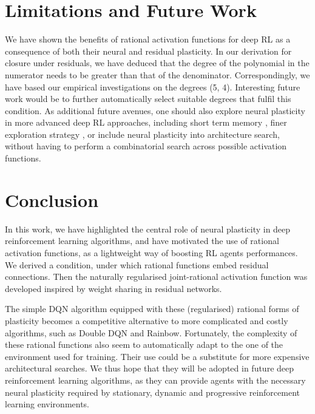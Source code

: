 \documentclass[accepted]{article}
\theoremstyle{plain}
\theoremstyle{definition}
\theoremstyle{remark}
\begin{document}
\section{Limitations and Future Work}
We have shown the benefits of rational activation functions for deep RL as a consequence of both their neural and residual plasticity. In our derivation for closure under residuals, we have deduced that the degree of the polynomial in the numerator needs to be greater than that of the denominator. Correspondingly, we have based our empirical investigations on the degrees (5, 4). Interesting future work would be to further automatically select suitable degrees that fulfil this condition. 
As additional future avenues, one should also explore neural plasticity in more advanced deep RL approaches, including short term memory \citep{Kapturowski19r2d2}, finer exploration strategy \citep{BadiaSVGPKTAPBB20NGU}, or include neural plasticity into architecture search, without having to perform a combinatorial search across possible activation functions.



\section{Conclusion}
In this work, we have highlighted the central role of neural plasticity in deep reinforcement learning algorithms, and have motivated the use of rational activation functions, as a lightweight way of boosting RL agents performances. We derived a condition, under which rational functions embed residual connections. Then the naturally regularised joint-rational activation function was developed inspired by weight sharing in residual networks.

The simple DQN algorithm equipped with these (regularised) rational forms of plasticity becomes a competitive alternative to more complicated and costly algorithms, such as Double DQN and Rainbow. Fortunately, the complexity of these rational functions also seem to automatically adapt to the one of the environment used for training. Their use could be a substitute for more expensive architectural searches. We thus hope that they will be adopted in future deep reinforcement learning algorithms, as they can provide agents with the necessary neural plasticity required by stationary, dynamic and progressive reinforcement learning environments.






\newpage
\appendix
\onecolumn
\end{document}
